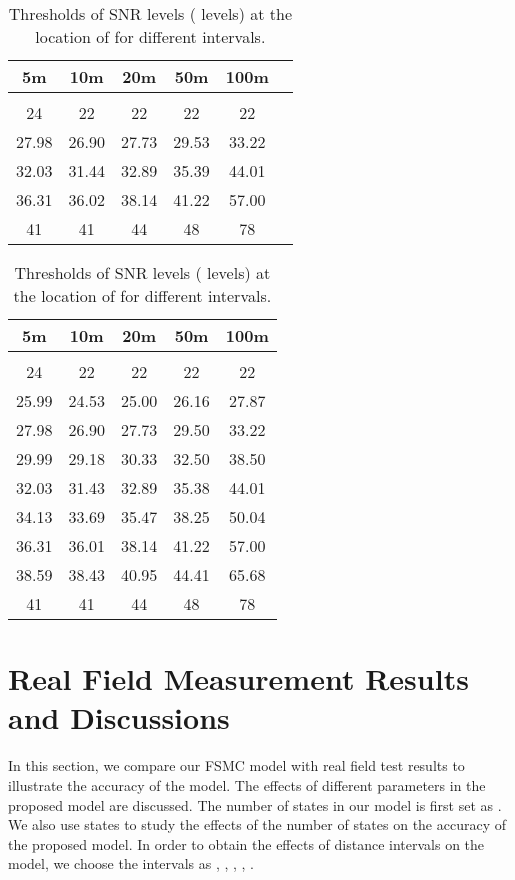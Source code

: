 \documentclass[conference]{IEEEtran}
\begin{document}
\begin{table}[tp]
\caption{Thresholds of SNR levels ( levels) at the location of  for different intervals.}
\label{Thresholds_4}
\begin{tabular}{|c|c|c|c|c|c|}
\hline
5m&10m&20m&50m&100m\\ \hline
&&&&\\ \hline
24	    &22	    &22     &22     &22\\ \hline
27.98	&26.90	&27.73  &29.53	&33.22\\ \hline
32.03	&31.44	&32.89	&35.39	&44.01\\ \hline
36.31	&36.02  &38.14	&41.22	&57.00\\ \hline
41	&41     &44	    &48     &78\\ \hline
\end{tabular}
\caption{Thresholds of SNR levels ( levels) at the location of  for different intervals.}
\label{Thresholds_8}
\begin{tabular}{|c|c|c|c|c|}
\hline
5m          &10m        &20m          &50m         &100m     \\ \hline
&&&&\\ \hline
24	    &22	    &22     &22     &22\\ \hline
25.99	&24.53	&25.00  &26.16	&27.87\\ \hline
27.98	&26.90	&27.73	&29.50	&33.22\\ \hline
29.99	&29.18  &30.33	&32.50	&38.50\\ \hline
32.03	&31.43  &32.89  &35.38  &44.01\\ \hline
34.13	&33.69	&35.47  &38.25	&50.04\\ \hline
36.31	&36.01	&38.14	&41.22	&57.00\\ \hline
38.59	&38.43  &40.95	&44.41	&65.68\\ \hline
41	    &41     &44	    &48     &78   \\ \hline
\end{tabular}
\end{table}

\section{Real Field Measurement Results and Discussions}
\label{Sec_TestandDiscussion}
In this section, we compare our FSMC model with real field test results to illustrate the accuracy  of the model. The effects of different parameters in the proposed model are discussed. The number of states in our model is first set as . We also use  states to study the effects of the number of states on the  accuracy of the proposed model. In order to obtain the effects of distance intervals on the model, we choose the intervals as , , , , .
\end{document}
